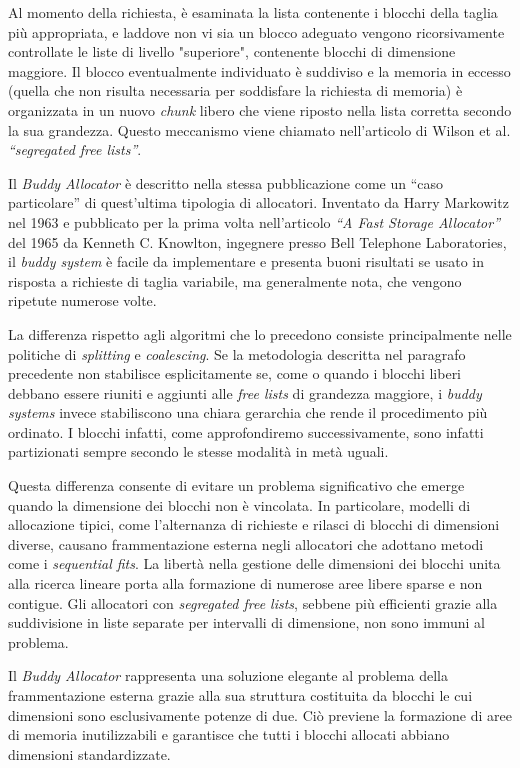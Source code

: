 Al momento della richiesta, è esaminata la lista contenente i blocchi della taglia più appropriata, e laddove non vi sia un blocco adeguato vengono ricorsivamente controllate le liste di livello "superiore", contenente blocchi di dimensione maggiore. Il blocco eventualmente individuato è suddiviso e la memoria in eccesso (quella che non risulta necessaria per soddisfare la richiesta di memoria) è organizzata in un nuovo \textit{chunk} libero che viene riposto nella lista corretta secondo la sua grandezza. Questo meccanismo viene chiamato nell’articolo di Wilson et al. \textit{“segregated free lists”}.

Il \textit{Buddy Allocator} è descritto nella stessa pubblicazione come un “caso particolare” di quest'ultima tipologia di allocatori. Inventato da Harry Markowitz nel 1963 e pubblicato per la prima volta nell’articolo \textit{“A Fast Storage Allocator”}~\cite{knowlton1965} del 1965 da Kenneth C. Knowlton, ingegnere presso Bell Telephone Laboratories, il \textit{buddy system} è facile da implementare e presenta buoni risultati se usato in risposta a richieste di taglia variabile, ma generalmente nota, che vengono ripetute numerose volte.
 
La differenza rispetto agli algoritmi che lo precedono consiste principalmente nelle politiche di \textit{splitting} e \textit{coalescing}. Se la metodologia descritta nel paragrafo precedente non stabilisce esplicitamente se, come o quando i blocchi liberi debbano essere riuniti e aggiunti alle \textit{free lists} di grandezza maggiore, i \textit{buddy systems} invece stabiliscono una chiara gerarchia che rende il procedimento più ordinato. I blocchi infatti, come approfondiremo successivamente, sono infatti partizionati sempre secondo le stesse modalità in metà uguali.

Questa differenza consente di evitare un problema significativo che emerge quando la dimensione dei blocchi non è vincolata. In particolare, modelli di allocazione tipici, come l'alternanza di richieste e rilasci di blocchi di dimensioni diverse, causano frammentazione esterna negli allocatori che adottano metodi come i \textit{sequential fits}. La libertà nella gestione delle dimensioni dei blocchi unita alla ricerca lineare porta alla formazione di numerose aree libere sparse e non contigue. Gli allocatori con \textit{segregated free lists}, sebbene più efficienti grazie alla suddivisione in liste separate per intervalli di dimensione, non sono immuni al problema.

Il \textit{Buddy Allocator} rappresenta una soluzione elegante al problema della frammentazione esterna grazie alla sua struttura costituita da blocchi le cui dimensioni sono esclusivamente potenze di due. Ciò previene la formazione di aree di memoria inutilizzabili e garantisce che tutti i blocchi allocati abbiano dimensioni standardizzate.

